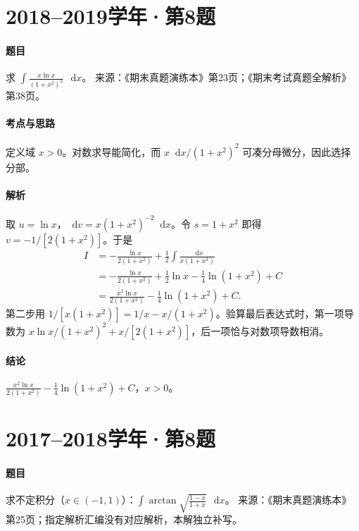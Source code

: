 \documentclass[UTF8,fontset=fandol,12pt,oneside,openany]{ctexrep}
\newcommand{\dd}{\mathop{}\!\mathrm d}
\theoremstyle{definition}
\begin{document}
\par\addvspace{18pt}\noindent\begin{minipage}{\linewidth}
\section{2018--2019学年·第8题}
\paragraph{题目}求 $\displaystyle\int\frac{x\ln x}{(1+x^2)^2}\,\dd x$。
来源：《期末真题演练本》第23页；《期末考试真题全解析》第38页。
\end{minipage}\par
\paragraph{考点与思路}定义域 $x>0$。对数求导能简化，而 $x\dd x/(1+x^2)^2$ 可凑分母微分，因此选择分部。
\paragraph{解析}取 $u=\ln x$，$\dd v=x(1+x^2)^{-2}\dd x$。令 $s=1+x^2$ 即得 $v=-1/[2(1+x^2)]$。于是
\begin{align*}
I&=-\frac{\ln x}{2(1+x^2)}+\frac12\int\frac{\dd x}{x(1+x^2)}\\
&=-\frac{\ln x}{2(1+x^2)}+\frac12\ln x-\frac14\ln(1+x^2)+C\\
&=\frac{x^2\ln x}{2(1+x^2)}-\frac14\ln(1+x^2)+C.
\end{align*}
第二步用 $1/[x(1+x^2)]=1/x-x/(1+x^2)$。验算最后表达式时，第一项导数为 $x\ln x/(1+x^2)^2+x/[2(1+x^2)]$，后一项恰与对数项导数相消。
\paragraph{结论}$\boxed{\frac{x^2\ln x}{2(1+x^2)}-\frac14\ln(1+x^2)+C}$，$x>0$。

\par\addvspace{18pt}\noindent\begin{minipage}{\linewidth}
\section{2017--2018学年·第8题}
\paragraph{题目}求不定积分（$x\in(-1,1)$）：$\displaystyle\int\arctan\sqrt{\frac{1-x}{1+x}}\,\dd x$。
来源：《期末真题演练本》第25页；指定解析汇编没有对应解析，本解独立补写。
\end{minipage}\par
\end{document}
